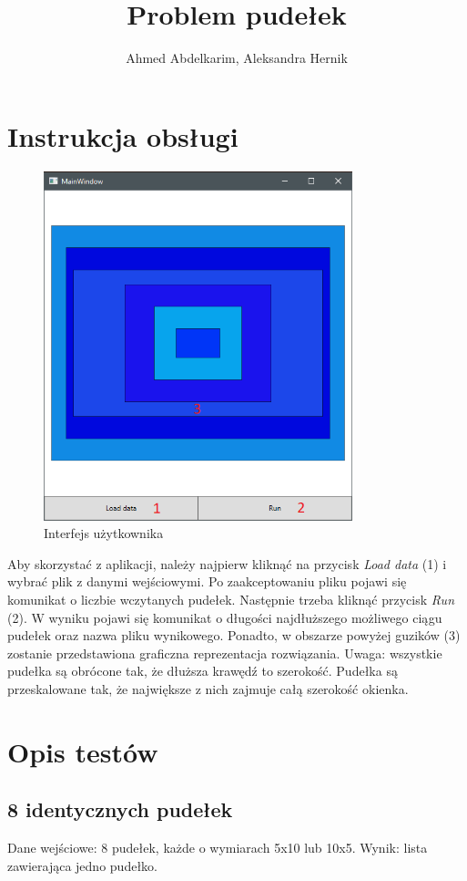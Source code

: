 \documentclass{article}
\title{Problem pudełek}
\author{Ahmed Abdelkarim, Aleksandra Hernik}
\begin{document}
\maketitle

\section{Instrukcja obsługi}
\begin{figure}[H]
\centering
\includegraphics[width=0.8\textwidth]{instrukcja.png}
\caption{Interfejs użytkownika}
\end{figure}
Aby skorzystać z aplikacji, należy najpierw kliknąć na przycisk \textit{Load data} (1) i wybrać plik z danymi wejściowymi. Po zaakceptowaniu pliku pojawi się komunikat o liczbie wczytanych pudełek. Następnie trzeba kliknąć przycisk \textit{Run} (2). W wyniku pojawi się komunikat o długości najdłuższego możliwego ciągu pudełek oraz nazwa pliku wynikowego. Ponadto, w obszarze powyżej guzików (3) zostanie przedstawiona graficzna reprezentacja rozwiązania. Uwaga: wszystkie pudełka są obrócone tak, że dłuższa krawędź to szerokość.  Pudełka są przeskalowane tak, że największe z nich zajmuje całą szerokość okienka.

\section{Opis testów}
\subsection{8 identycznych pudełek}
Dane wejściowe: 8 pudełek, każde o wymiarach 5x10 lub 10x5.
Wynik: lista zawierająca jedno pudełko.
\end{document}
